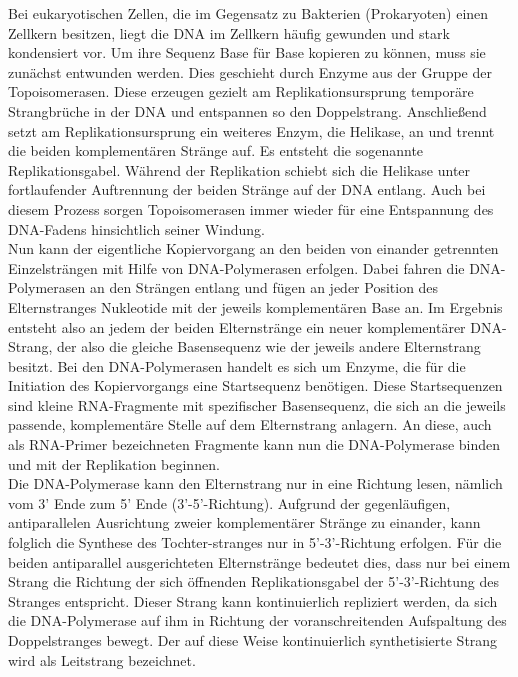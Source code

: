 Bei eukaryotischen Zellen, die im Gegensatz zu Bakterien (Prokaryoten) einen Zellkern besitzen, liegt die DNA im Zellkern häufig gewunden und stark kondensiert vor. Um ihre Sequenz Base für Base kopieren zu können, muss sie zunächst entwunden werden. Dies geschieht durch Enzyme aus der Gruppe der Topoisomerasen. Diese erzeugen gezielt am Replikationsursprung temporäre Strangbrüche in der DNA und entspannen so den Doppelstrang. Anschließend setzt am Replikationsursprung ein weiteres Enzym, die Helikase, an und trennt die beiden komplementären Stränge auf. Es entsteht die sogenannte Replikationsgabel. Während der Replikation schiebt sich die Helikase unter fortlaufender Auftrennung der beiden Stränge auf der DNA entlang. Auch bei diesem Prozess sorgen Topoisomerasen immer wieder für eine Entspannung des DNA-Fadens hinsichtlich seiner Windung. \\

Nun kann der eigentliche Kopiervorgang an den beiden von einander getrennten Einzelsträngen mit Hilfe von DNA-Polymerasen erfolgen. Dabei fahren die DNA-Polymerasen an den Strängen entlang und fügen an jeder Position des Elternstranges Nukleotide mit der jeweils komplementären Base an. Im Ergebnis entsteht also an jedem der beiden Elternstränge ein neuer komplementärer DNA-Strang, der also die gleiche Basensequenz wie der jeweils andere Elternstrang besitzt. Bei den DNA-Polymerasen handelt es sich um Enzyme, die für die Initiation des Kopiervorgangs eine Startsequenz benötigen. Diese Startsequenzen sind kleine RNA-Fragmente mit spezifischer Basensequenz, die sich an die jeweils passende, komplementäre Stelle auf dem Elternstrang anlagern. An diese, auch als RNA-Primer bezeichneten Fragmente kann nun die DNA-Polymerase binden und mit der Replikation beginnen. \\

Die DNA-Polymerase kann den Elternstrang nur in eine Richtung lesen, nämlich vom 3' Ende zum 5' Ende (3'-5'-Richtung). Aufgrund der gegenläufigen, antiparallelen Ausrichtung zweier komplementärer Stränge zu einander, kann folglich die Synthese des Tochter-stranges nur in 5'-3'-Richtung erfolgen. Für die beiden antiparallel ausgerichteten Elternstränge bedeutet dies, dass nur bei einem Strang die Richtung der sich öffnenden Replikationsgabel der 5'-3'-Richtung des Stranges entspricht. Dieser Strang kann kontinuierlich repliziert werden, da sich die DNA-Polymerase auf ihm in Richtung der voranschreitenden Aufspaltung des Doppelstranges bewegt. Der auf diese Weise kontinuierlich synthetisierte Strang wird als Leitstrang bezeichnet. \\

